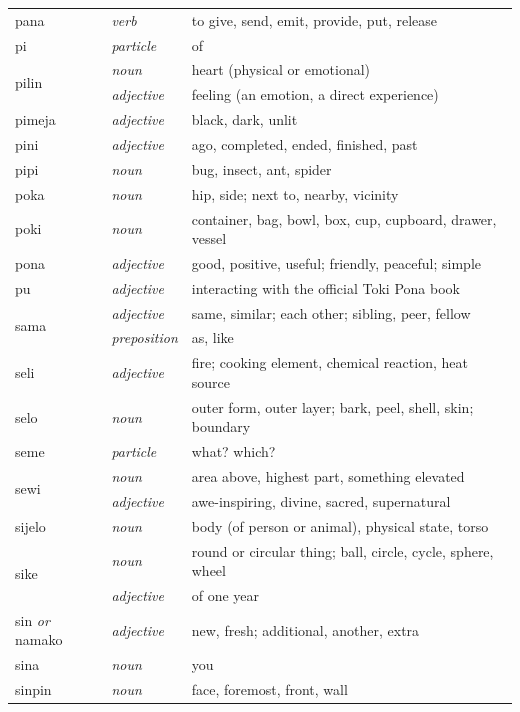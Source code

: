 \documentclass[14pt, a4paper]{extreport}
\begin{document}
\begin{longtable}{llp{10cm}}
  pana & \textit{verb} & to give, send, emit, provide, put, release \\
  pi & \textit{particle} & of \\
  \multirow[t]{2}{*}{pilin} & \textit{noun} & heart (physical or emotional) \\
  & \textit{adjective} & feeling (an emotion, a direct experience) \\
  pimeja & \textit{adjective} & black, dark, unlit \\
  pini & \textit{adjective} & ago, completed, ended, finished, past \\
  pipi & \textit{noun} & bug, insect, ant, spider \\
  poka & \textit{noun} & hip, side; next to, nearby, vicinity \\
  poki & \textit{noun} & container, bag, bowl, box, cup, cupboard, drawer, vessel \\
  pona & \textit{adjective} & good, positive, useful; friendly, peaceful; simple \\
  pu & \textit{adjective} & interacting with the official Toki Pona book \\
  \multirow[t]{2}{*}{sama} & \textit{adjective} & same, similar; each other; sibling, peer, fellow \\
  & \textit{preposition} & as, like \\
  seli & \textit{adjective} & fire; cooking element, chemical reaction, heat source \\
  selo & \textit{noun} & outer form, outer layer; bark, peel, shell, skin; boundary \\
  seme & \textit{particle} & what? which? \\
  \multirow[t]{2}{*}{sewi} & \textit{noun} & area above, highest part, something elevated \\
  & \textit{adjective} & awe-inspiring, divine, sacred, supernatural \\
  sijelo & \textit{noun} & body (of person or animal), physical state, torso \\
  \multirow[t]{2}{*}{sike} & \textit{noun} & round or circular thing; ball, circle, cycle, sphere, wheel \\
  & \textit{adjective} & of one year \\
  sin \textit{or} namako & \textit{adjective} & new, fresh; additional, another, extra \\
  sina & \textit{noun} & you \\
  sinpin & \textit{noun} & face, foremost, front, wall \\

\end{longtable}
\end{document}
